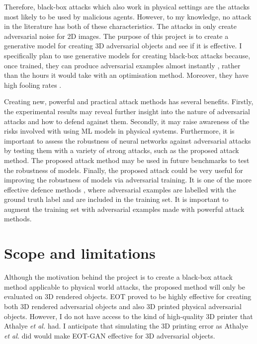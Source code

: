 Therefore, black-box attacks which also work in physical settings are the attacks most likely to be used by malicious agents. However, to my knowledge, no attack in the literature has both of these characteristics. The attacks in \cite{upset_angri, zheng_black_box_GAN, advGAN} only create adversarial noise for 2D images. The purpose of this project is to create a generative model for creating 3D adversarial objects \cite{athalye} and see if it is effective.  I specifically plan to use generative models for creating black-box attacks because, once trained, they can produce adversarial examples almost instantly \cite{advGAN}, rather than the hours it would take with an optimisation method. Moreover, they have high fooling rates \cite{upset_angri, zheng_black_box_GAN, advGAN}.

Creating new, powerful and practical attack methods has several benefits. Firstly, the experimental results may reveal further insight into the nature of adversarial attacks and how to defend against them. Secondly, it may raise awareness of the risks involved with using ML models in physical systems. Furthermore, it is important to assess the robustness of neural networks against adversarial attacks by testing them with a variety of strong attacks, such as the proposed attack method. The proposed attack method may be used in future benchmarks to test the robustness of models. Finally, the proposed attack could be very useful for improving the robustness of models via adversarial training. It is one of the more effective defence methods \cite{dong2020benchmarking}, where adversarial examples are labelled with the ground truth label and are included in the training set. It is important to augment the training set with adversarial examples made with powerful attack methods.

\section{Scope and limitations}
    \label{sec:scope_limitations}
    
Although the motivation behind the project is to create a black-box attack method applicable to physical world attacks, the proposed method will only be evaluated on 3D rendered objects. EOT \cite{athalye} proved to be highly effective for creating both 3D rendered adversarial objects and also 3D printed physical adversarial objects. However, I do not have access to the kind of high-quality 3D printer that Athalye \textit{et al.} \cite{athalye} had. I anticipate that simulating the 3D printing error as Athalye \textit{et al.} \cite{athalye} did would make EOT-GAN effective for 3D adversarial objects.

